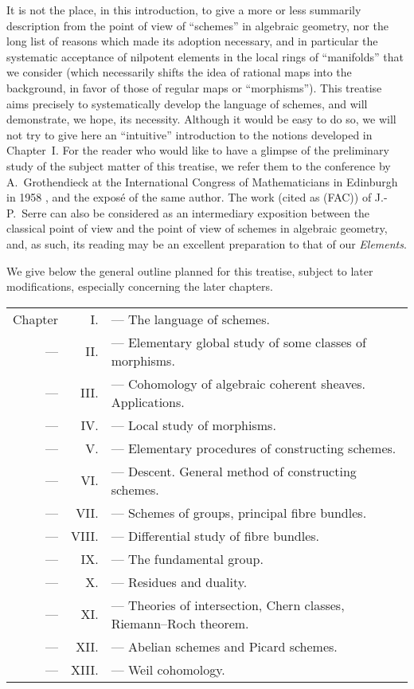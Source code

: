 It is not the place, in this introduction, to give a more or less summarily
description from the point of view of ``schemes'' in algebraic geometry, nor the
long list of reasons which made its adoption necessary, and in particular the
systematic acceptance of nilpotent elements in the local rings of ``manifolds''
that we consider (which necessarily shifts the idea of rational maps into
the background, in favor of those of regular maps or ``morphisms''). This
treatise aims precisely to systematically develop the language of schemes, and
will demonstrate, we hope, its necessity. Although it would be easy to do so,
we will not try to give here an ``intuitive'' introduction to the
notions developed in Chapter~I. For the reader who would like to have a glimpse
of the preliminary study of the subject matter of this treatise, we refer them
to the conference by A.~Grothendieck at the International Congress of
Mathematicians in Edinburgh in 1958 \cite{I-7}, and the expos\'e \cite{I-8} of the
same author. The work \cite{I-14} (cited as (FAC)) of J.-P.~Serre can also be
considered as an intermediary exposition between the classical point of view and
the point of view of schemes in algebraic geometry, and, as such, its reading
may be an excellent preparation to that of our {\it Elements}.

\sectionbreak

We give below the general outline planned for this treatise, subject to later
modifications, especially concerning the later chapters.

\begin{tabular}{rrl}
Chapter & I. & --- The language of schemes.\\
--- & II. & --- Elementary global study of some classes of morphisms.\\
--- & III. & --- Cohomology of algebraic coherent sheaves. Applications.\\
--- & IV. & --- Local study of morphisms.\\
--- & V. & --- Elementary procedures of constructing schemes.\\
--- & VI. & --- Descent. General method of constructing schemes.\\
--- & VII. & --- Schemes of groups, principal fibre bundles.\\
--- & VIII. & --- Differential study of fibre bundles.\\
--- & IX. & --- The fundamental group.\\
--- & X. & --- Residues and duality.\\
--- & XI. & --- Theories of intersection, Chern classes,
Riemann--Roch theorem.\\
--- & XII. & --- Abelian schemes and Picard schemes.\\
--- & XIII. & --- Weil cohomology.
\end{tabular}\\

